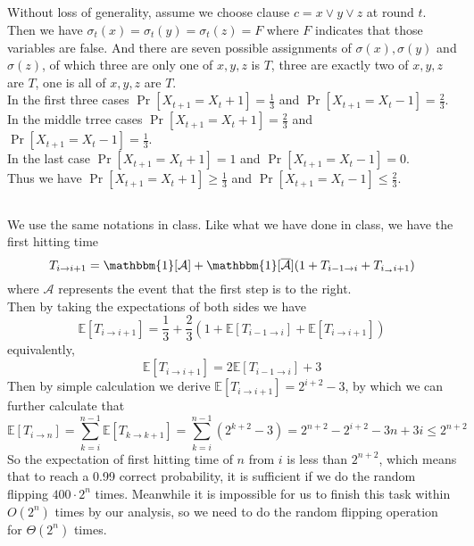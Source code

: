 \documentclass[12pt,letterpaper]{article}
\begin{document}
\subsection{}
Without loss of generality, assume we choose clause $c=x\vee y\vee z$ at round $t$.
Then we have $\sigma_t(x)=\sigma_t(y)=\sigma_t(z)=F$ where $F$ indicates that those variables are false.
And there are seven possible assignments of $\sigma(x),\sigma(y)$ and $\sigma(z)$,
of which three are only one of $x,y,z$ is $T$,
three are exactly two of $x,y,z$ are $T$,
one is all of $x,y,z$ are $T$.\\
In the first three cases $\Pr\left[X_{t+1}=X_{t}+1\right]=\frac{1}{3}$ and $\Pr\left[X_{t+1}=X_{t}-1\right]=\frac{2}{3}$.\\
In the middle trree cases  $\Pr\left[X_{t+1}=X_{t}+1\right]=\frac{2}{3}$ and $\Pr\left[X_{t+1}=X_{t}-1\right]=\frac{1}{3}$.\\
In the last case $\Pr\left[X_{t+1}=X_{t}+1\right]=1$ and $\Pr\left[X_{t+1}=X_{t}-1\right]=0$.\\
Thus we have $\Pr\left[X_{t+1}=X_{t}+1\right]\geq \frac{1}{3}$ and $\Pr\left[X_{t+1}=X_{t}-1\right]\leq\frac{2}{3}$.\\

\subsection{}
We use the same notations in class.
Like what we have done in class, we have the first hitting time 
$$T_{i\to i+1}=\mathbbm{1}[\mathcal{A}]+\mathbbm{1}[\overline{\mathcal{A}}](1+T_{i-1\to i}+T_{i_\to i+1})$$
where $\mathcal{A}$ represents the event that the first step is to the right.\\
Then by taking the expectations of both sides we have 
$$\mathbb{E}\left[T_{i\to i+1}\right]=\frac{1}{3}+\frac{2}{3}(1+\mathbb{E}\left[T_{i-1\to i}\right]+\mathbb{E}\left[T_{i\to i+1}\right])$$
equivalently,
$$\mathbb{E}\left[T_{i\to i+1}\right]=2\mathbb{E}\left[T_{i-1\to i}\right]+3$$
Then by simple calculation we derive $\mathbb{E}\left[T_{i\to i+1}\right]=2^{i+2}-3$,
by which we can further calculate that 
$$\mathbb{E}\left[T_{i\to n}\right]=\sum_{k=i}^{n-1}\mathbb{E}\left[T_{k\to k+1}\right]=\sum_{k=i}^{n-1}(2^{k+2}-3)=2^{n+2}-2^{i+2}-3n+3i\leq 2^{n+2}$$
So the expectation of first hitting time of $n$ from $i$ is less than $2^{n+2}$,
which means that to reach a 0.99 correct probability, 
it is sufficient if we do the random flipping  $400\cdot2^n$ times.
Meanwhile it is impossible for us to finish this task within $O(2^n)$ times by our analysis,
so we need to do the random flipping operation for $\Theta(2^n)$ times.
\end{document}
